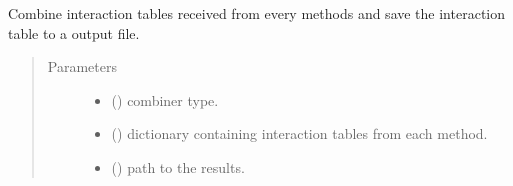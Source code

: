 \documentclass[letterpaper,10pt,english]{sphinxmanual}
\begin{document}
\begin{fulllineitems}
\label{\detokenize{_modules/cosifer.pipelines:cosifer.pipelines.pipeline_gui.run_combiner}}
Combine interaction tables received from every methods and
save the interaction table to a output file.
\begin{quote}\begin{description}
\item[{Parameters}] \leavevmode\begin{itemize}
\item {} 
 () \textendash{} combiner type.

\item {} 
 () \textendash{} dictionary containing interaction
tables from each method.

\item {} 
 () \textendash{} path to the results.

\end{itemize}

\end{description}\end{quote}

\end{fulllineitems}

\end{document}

